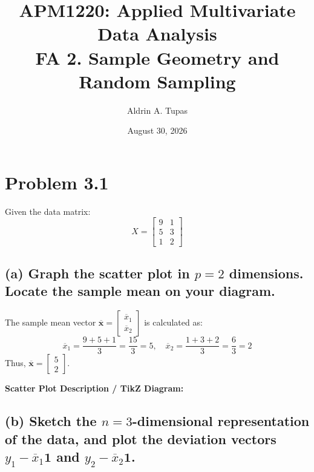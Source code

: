 \documentclass[11pt,a4paper]{article}
\title{\textbf{APM1220: Applied Multivariate Data Analysis}\\ FA 2. Sample Geometry and Random Sampling}
\author{Aldrin A. Tupas}
\date{August 30, 2026}
\begin{document}
\maketitle

\section*{Problem 3.1}

Given the data matrix:
\[
X = \begin{bmatrix} 9 & 1 \\ 5 & 3 \\ 1 & 2 \end{bmatrix}
\]

\subsection*{(a) Graph the scatter plot in $p=2$ dimensions. Locate the sample mean on your diagram.}

The sample mean vector $\overline{\mathbf{x}} = \begin{bmatrix} \overline{x}_1 \\ \overline{x}_2 \end{bmatrix}$ is calculated as:
\[
\overline{x}_1 = \frac{9 + 5 + 1}{3} = \frac{15}{3} = 5, \quad \overline{x}_2 = \frac{1 + 3 + 2}{3} = \frac{6}{3} = 2
\]
Thus, $\overline{\mathbf{x}} = \begin{bmatrix} 5 \\ 2 \end{bmatrix}$.

\textbf{Scatter Plot Description / TikZ Diagram:}
\begin{center}
\end{center}

\subsection*{(b) Sketch the $n=3$-dimensional representation of the data, and plot the deviation vectors $y_1 - \overline{x}_1\mathbf{1}$ and $y_2 - \overline{x}_2\mathbf{1}$.}
\end{document}
